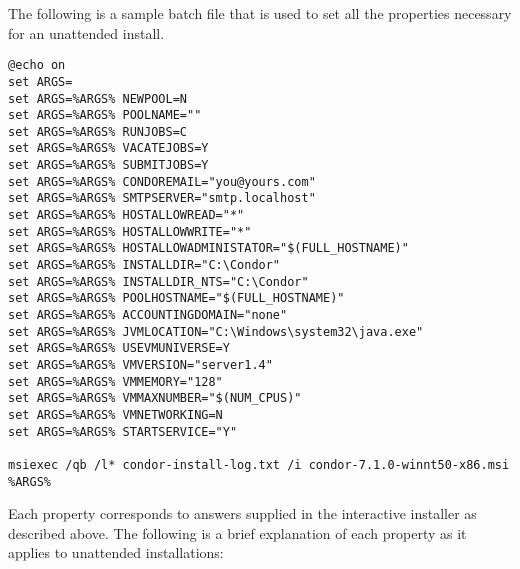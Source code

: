 The following is a sample batch file that is used to set all the
properties necessary for an unattended install.

\begin{verbatim}
@echo on
set ARGS=
set ARGS=%ARGS% NEWPOOL=N
set ARGS=%ARGS% POOLNAME=""
set ARGS=%ARGS% RUNJOBS=C
set ARGS=%ARGS% VACATEJOBS=Y
set ARGS=%ARGS% SUBMITJOBS=Y
set ARGS=%ARGS% CONDOREMAIL="you@yours.com"
set ARGS=%ARGS% SMTPSERVER="smtp.localhost"
set ARGS=%ARGS% HOSTALLOWREAD="*"
set ARGS=%ARGS% HOSTALLOWWRITE="*"
set ARGS=%ARGS% HOSTALLOWADMINISTATOR="$(FULL_HOSTNAME)"
set ARGS=%ARGS% INSTALLDIR="C:\Condor"
set ARGS=%ARGS% INSTALLDIR_NTS="C:\Condor"
set ARGS=%ARGS% POOLHOSTNAME="$(FULL_HOSTNAME)"
set ARGS=%ARGS% ACCOUNTINGDOMAIN="none"
set ARGS=%ARGS% JVMLOCATION="C:\Windows\system32\java.exe"
set ARGS=%ARGS% USEVMUNIVERSE=Y
set ARGS=%ARGS% VMVERSION="server1.4"
set ARGS=%ARGS% VMMEMORY="128"
set ARGS=%ARGS% VMMAXNUMBER="$(NUM_CPUS)"
set ARGS=%ARGS% VMNETWORKING=N
set ARGS=%ARGS% STARTSERVICE="Y"

msiexec /qb /l* condor-install-log.txt /i condor-7.1.0-winnt50-x86.msi %ARGS%
\end{verbatim}

Each property corresponds to answers supplied in the interactive installer
as described above. The following is a brief explanation of each property
as it applies to unattended installations:

